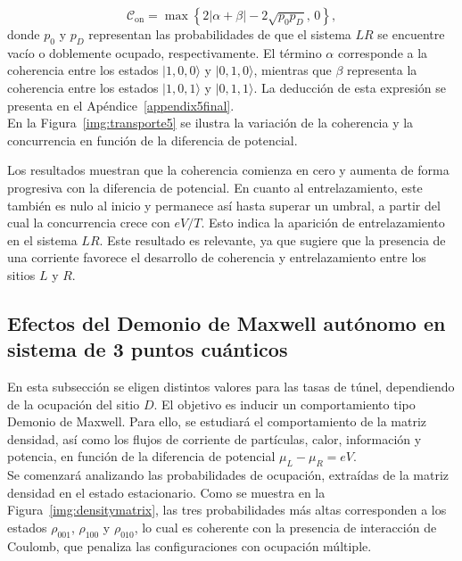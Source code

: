 \[
\mathcal{C}_{\text{on}} = \max \left\{ 2|\alpha + \beta| - 2\sqrt{p_0 p_D},\, 0 \right\},
\]
donde $p_0$ y $p_D$ representan las probabilidades de que el sistema $LR$ se encuentre vacío o doblemente ocupado, respectivamente. El término $\alpha$ corresponde a la coherencia entre los estados $|1,0,0\rangle$ y $|0,1,0\rangle$, mientras que $\beta$ representa la coherencia entre los estados $|1,0,1\rangle$ y $|0,1,1\rangle$. La deducción de esta expresión se presenta en el Apéndice~\ref{appendix5final}.  
\\

En la Figura~\ref{img:transporte5} se ilustra la variación de la coherencia y la concurrencia en función de la diferencia de potencial.  

    
Los resultados muestran que la coherencia comienza en cero y aumenta de forma progresiva con la diferencia de potencial. En cuanto al entrelazamiento, este también es nulo al inicio y permanece así hasta superar un umbral, a partir del cual la concurrencia crece con $eV/T$. Esto indica la aparición de entrelazamiento en el sistema $LR$. Este resultado es relevante, ya que sugiere que la presencia de una corriente favorece el desarrollo de coherencia y entrelazamiento entre los sitios $L$ y $R$.  

\label{sec5:transporte}



\subsection{Efectos del Demonio de Maxwell autónomo en sistema de 3 puntos cuánticos}
En esta subsección se eligen distintos valores para las tasas de túnel, dependiendo de la ocupación del sitio $D$. El objetivo es inducir un comportamiento tipo Demonio de Maxwell. Para ello, se estudiará el comportamiento de la matriz densidad, así como los flujos de corriente de partículas, calor, información y potencia, en función de la diferencia de potencial $\mu_{L} - \mu_{R} = eV$.
\\

Se comenzará analizando las probabilidades de ocupación, extraídas de la matriz densidad en el estado estacionario. Como se muestra en la Figura~\ref{img:densitymatrix}, las tres probabilidades más altas corresponden a los estados $\rho_{001}$, $\rho_{100}$ y $\rho_{010}$, lo cual es coherente con la presencia de interacción de Coulomb, que penaliza las configuraciones con ocupación múltiple.
\\

